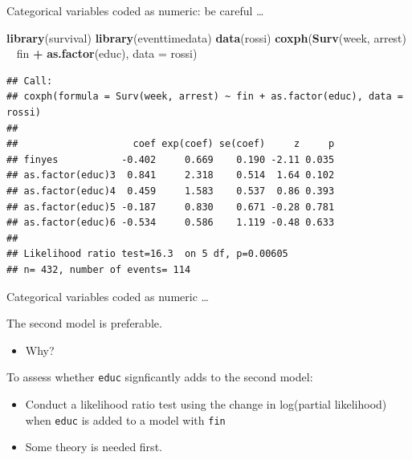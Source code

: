 \documentclass[ignorenonframetext,]{beamer}
\newenvironment{Shaded}{\begin{snugshade}}{\end{snugshade}}
\newcommand{\DataTypeTok}[1]{\textcolor[rgb]{0.13,0.29,0.53}{#1}}
\newcommand{\KeywordTok}[1]{\textcolor[rgb]{0.13,0.29,0.53}{\textbf{#1}}}
\newcommand{\NormalTok}[1]{#1}
\newcommand{\OperatorTok}[1]{\textcolor[rgb]{0.81,0.36,0.00}{\textbf{#1}}}
\newcommand{\StringTok}[1]{\textcolor[rgb]{0.31,0.60,0.02}{#1}}
\providecommand{\tightlist}{%
  \setlength{\itemsep}{0pt}\setlength{\parskip}{0pt}}
\begin{document}
\begin{frame}[fragile]{%
\protect\hypertarget{categorical-variables-coded-as-numeric-be-careful}{%
Categorical variables coded as numeric: be careful \ldots}}

\footnotesize

\begin{Shaded}
\begin{Highlighting}[]
\KeywordTok{library}\NormalTok{(survival)}
\KeywordTok{library}\NormalTok{(eventtimedata)}
\KeywordTok{data}\NormalTok{(rossi)}
\KeywordTok{coxph}\NormalTok{(}\KeywordTok{Surv}\NormalTok{(week, arrest) }\OperatorTok{~}\StringTok{ }\NormalTok{fin }\OperatorTok{+}\StringTok{ }\KeywordTok{as.factor}\NormalTok{(educ), }\DataTypeTok{data =}\NormalTok{ rossi)}
\end{Highlighting}
\end{Shaded}

\begin{verbatim}
## Call:
## coxph(formula = Surv(week, arrest) ~ fin + as.factor(educ), data = rossi)
## 
##                    coef exp(coef) se(coef)     z     p
## finyes           -0.402     0.669    0.190 -2.11 0.035
## as.factor(educ)3  0.841     2.318    0.514  1.64 0.102
## as.factor(educ)4  0.459     1.583    0.537  0.86 0.393
## as.factor(educ)5 -0.187     0.830    0.671 -0.28 0.781
## as.factor(educ)6 -0.534     0.586    1.119 -0.48 0.633
## 
## Likelihood ratio test=16.3  on 5 df, p=0.00605
## n= 432, number of events= 114
\end{verbatim}

\end{frame}

\begin{frame}{%
\protect\hypertarget{categorical-variables-coded-as-numeric-2}{%
Categorical variables coded as numeric \dots}}

The second model is preferable.

\begin{itemize}
\tightlist
\item
  Why?
\end{itemize}

To assess whether \texttt{educ} signficantly adds to the second model:

\begin{itemize}
\item
  Conduct a likelihood ratio test using the change in log(partial
  likelihood) when \texttt{educ} is added to a model with \texttt{fin}
\item
  Some theory is needed first.
\end{itemize}

\end{frame}
\end{document}

